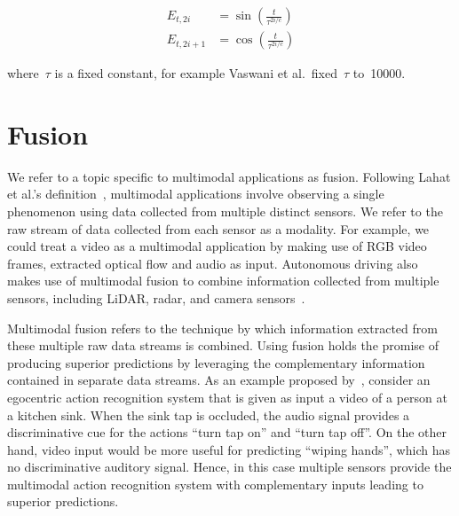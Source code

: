 \begin{equation}
\begin{split}
E_{t, 2i} &= \sin\left(\frac{t}{\tau^{2i/c}}\right) \\
E_{t, 2i + 1} &= \cos\left(\frac{t}{\tau^{2i/c}}\right)
\end{split}
\end{equation}

\noindent where~$\tau$ is a fixed constant, for example Vaswani et al.\ fixed~$\tau$
to~\num{10000}.






\section{Fusion}

We refer to a topic specific to multimodal applications as fusion.
Following Lahat et al.'s definition~\citep{Lahat2015MultimodalDF}, multimodal
applications involve observing a single phenomenon using data collected from
multiple distinct sensors.
We refer to the raw stream of data collected from each sensor as a modality.
For example, we could treat a video as a multimodal application by making use
of RGB video frames, extracted optical flow and audio as input.
Autonomous driving also makes use of multimodal fusion to combine information
collected from multiple sensors, including LiDAR, radar, and camera
sensors~\citep{Feng2019DeepMO}.

Multimodal fusion refers to the technique by which information extracted from
these multiple raw data streams is combined.
Using fusion holds the promise of producing superior predictions by leveraging
the complementary information contained in separate data streams.
As an example proposed by~\citet{kazakos2019TBN}, consider an egocentric action
recognition system that is given as input a video of a person at a kitchen
sink.
When the sink tap is occluded, the audio signal provides a discriminative cue
for the actions ``turn tap on'' and ``turn tap off''.
On the other hand, video input would be more useful for predicting ``wiping
hands'', which has no discriminative auditory signal.
Hence, in this case multiple sensors provide the multimodal action recognition
system with complementary inputs leading to superior predictions.


